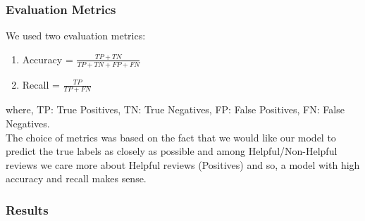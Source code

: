 \documentclass[final]{cvpr}
\begin{document}
\subsubsection{Evaluation Metrics}
We used two evaluation metrics:
\begin{enumerate}
    \item Accuracy = $\frac{ TP+TN }{TP+TN+FP+FN}$
    \item Recall = $\frac{TP}{TP+FN}$
\end{enumerate}

where, TP: True Positives, TN: True Negatives, FP: False Positives, FN: False Negatives.
\\
The choice of metrics was based on the fact that we would like our model to predict the true labels as closely as possible and among Helpful/Non-Helpful reviews we care more about Helpful reviews (Positives) and so, a model with high accuracy and recall makes sense.

\subsubsection{Results}
\end{document}
